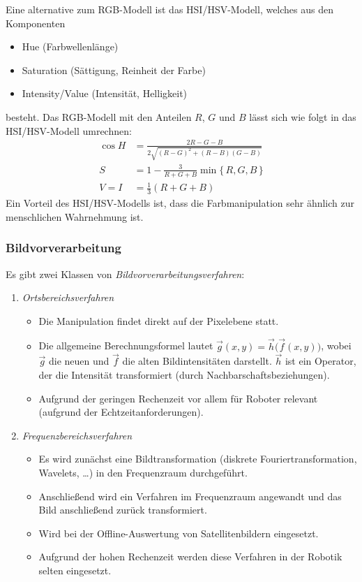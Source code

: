 				Eine alternative zum RGB-Modell ist das HSI/HSV-Modell, welches aus den Komponenten
				\begin{itemize}
					\item Hue (Farbwellenlänge)
					\item Saturation (Sättigung, Reinheit der Farbe)
					\item Intensity/Value (Intensität, Helligkeit)
				\end{itemize}
				besteht. Das RGB-Modell mit den Anteilen \(R\), \(G\) und \(B\) lässt sich wie folgt in das HSI/HSV-Modell umrechnen:
				\begin{align*}
					\cos H & = \frac{2R - G - B}{2\sqrt{(R - G)^2 + (R - B)(G - B)}} \\
					S      & = 1 - \frac{3}{R + G + B} \min \{\, R, G, B \,\}        \\
					V = I  & = \frac{1}{3} (R + G + B)
				\end{align*}
				Ein Vorteil des HSI/HSV-Modells ist, dass die Farbmanipulation sehr ähnlich zur menschlichen Wahrnehmung ist.

			\subsubsection{Bildvorverarbeitung}
				Es gibt zwei Klassen von \emph{Bildvorverarbeitungsverfahren}:
				\begin{enumerate}
					\item \emph{Ortsbereichsverfahren}
						\begin{itemize}
							\item Die Manipulation findet direkt auf der Pixelebene statt.
							\item Die allgemeine Berechnungsformel lautet \( \vec{g}(x, y) = \vec{h}\big(\vec{f}(x, y)\big) \), wobei \(\vec{g}\) die neuen und \(\vec{f}\) die alten Bildintensitäten darstellt. \(\vec{h}\) ist ein Operator, der die Intensität transformiert (\bspw durch Nachbarschaftsbeziehungen).
							\item Aufgrund der geringen Rechenzeit vor allem für Roboter relevant (aufgrund der Echtzeitanforderungen).
						\end{itemize}
					\item \emph{Frequenzbereichsverfahren}
						\begin{itemize}
							\item Es wird zunächst eine Bildtransformation (diskrete Fouriertransformation, Wavelets, \dots) in den Frequenzraum durchgeführt.
							\item Anschließend wird ein Verfahren im Frequenzraum angewandt und das Bild anschließend zurück transformiert.
							\item Wird \bspw bei der Offline-Auswertung von Satellitenbildern eingesetzt.
							\item Aufgrund der hohen Rechenzeit werden diese Verfahren in der Robotik selten eingesetzt.
						\end{itemize}
				\end{enumerate}

